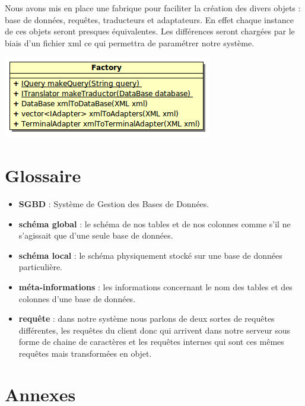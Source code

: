 \documentclass[12pt]{article}
\begin{document}
Nous avons mis en place une fabrique pour faciliter la création des divers objets : base de données, requêtes, traducteurs et adaptateurs. En effet chaque instance de ces objets seront presques équivalentes. Les différences seront chargées par le biais d'un fichier xml ce qui permettra de paramétrer notre système.

\begin{center}
	\includegraphics[scale=0.75]{images/Factory.png}
\end{center}

\newpage

\section{Glossaire}

	\begin{itemize}
		\item \textbf{SGBD} : Système de Gestion des Bases de Données.\\
		\item \textbf{schéma global} : le schéma de nos tables et de nos colonnes comme s'il ne s'agissait que d'une seule base de données.\\
		\item \textbf{schéma local} : le schéma physiquement stocké sur une base de données particulière.\\
		\item \textbf{méta-informations} : les informations concernant le nom des tables et des colonnes d'une base de données.\\
		\item \textbf{requête} : dans notre système nous parlons de deux sortes de requêtes différentes, les requêtes du client donc qui arrivent dans notre serveur sous forme de chaine de caractères et les requêtes internes qui sont ces mêmes requêtes mais transformées en objet.\\
	\end{itemize}
\newpage
\section{Annexes}
\end{document}
